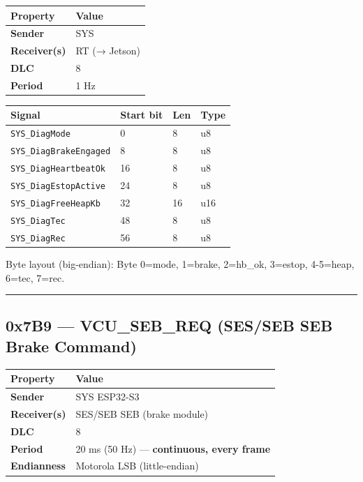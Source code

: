 \documentclass[12pt,a4paper,oneside]{report}
\begin{document}
\begin{longtable}[]{@{}ll@{}}
\toprule\noalign{}
Property & Value \\
\midrule\noalign{}
\endhead
\bottomrule\noalign{}
\endlastfoot
\textbf{Sender} & SYS \\
\textbf{Receiver(s)} & RT (→ Jetson) \\
\textbf{DLC} & 8 \\
\textbf{Period} & 1 Hz \\
\end{longtable}

\begin{longtable}[]{@{}llll@{}}
\toprule\noalign{}
Signal & Start bit & Len & Type \\
\midrule\noalign{}
\endhead
\bottomrule\noalign{}
\endlastfoot
\texttt{SYS\_DiagMode} & 0 & 8 & u8 \\
\texttt{SYS\_DiagBrakeEngaged} & 8 & 8 & u8 \\
\texttt{SYS\_DiagHeartbeatOk} & 16 & 8 & u8 \\
\texttt{SYS\_DiagEstopActive} & 24 & 8 & u8 \\
\texttt{SYS\_DiagFreeHeapKb} & 32 & 16 & u16 \\
\texttt{SYS\_DiagTec} & 48 & 8 & u8 \\
\texttt{SYS\_DiagRec} & 56 & 8 & u8 \\
\end{longtable}

Byte layout (big-endian): Byte 0=mode, 1=brake, 2=hb\_ok, 3=estop, 4-5=heap,
6=tec, 7=rec.

\begin{center}\rule{0.5\linewidth}{0.5pt}\end{center}

\subsection{0x7B9 --- VCU\_SEB\_REQ (SES/SEB SEB Brake
Command)}\label{x7b9-vcu_seb_req-SES/SEB-seb-brake-command}

\begin{longtable}[]{@{}ll@{}}
\toprule\noalign{}
Property & Value \\
\midrule\noalign{}
\endhead
\bottomrule\noalign{}
\endlastfoot
\textbf{Sender} & SYS ESP32-S3 \\
\textbf{Receiver(s)} & SES/SEB SEB (brake module) \\
\textbf{DLC} & 8 \\
\textbf{Period} & 20 ms (50 Hz) --- \textbf{continuous, every frame} \\
\textbf{Endianness} & Motorola LSB (little-endian) \\
\end{longtable}
\end{document}
